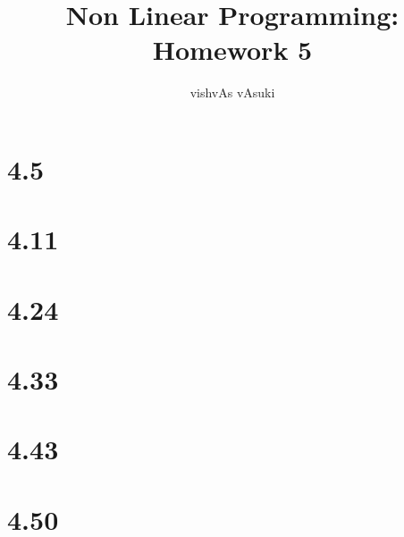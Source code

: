 \documentclass{article}
\title{Non Linear Programming: Homework 5}
\author{vishvAs vAsuki}
\begin{document}
\maketitle
\section{4.5}


\section{4.11}


\section{4.24}


\section{4.33}


\section{4.43}


\section{4.50}


% 
% 
\end{document}
